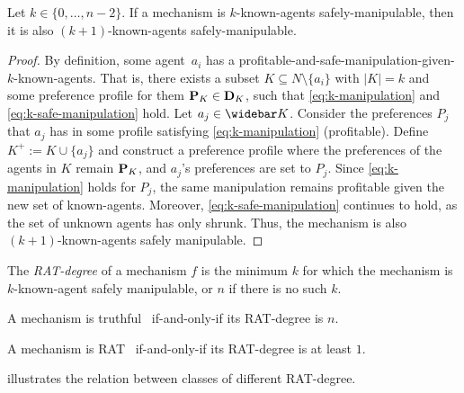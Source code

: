 \begin{propositionrep}
    Let $k \in \{0, \ldots, n-2\}$.
    If a mechanism is $k$-known-agents safely-manipulable, then it is also $(k+1)$-known-agents safely-manipulable.
\end{propositionrep}
\begin{proof}
    By definition, some agent~$a_i$ has a profitable-and-safe-manipulation-given-$k$-known-agents. 
    That is, there exists a subset $K \subseteq N \setminus \{a_i\}$ with $|K| = k$ and some preference profile for them $\mathbf{P}_{K} \in \mathbf{D}_{K}$, such that \eqref{eq:k-manipulation} and \eqref{eq:k-safe-manipulation} hold.
    Let $a_j \in \notK$.
    Consider the preferences $P_j$ that $a_j$ has in some profile satisfying \eqref{eq:k-manipulation} (profitable). 
    Define  $K^+ := K \cup \{a_j\}$ and construct a preference profile where the preferences of the agents in $K$ remain $\mathbf{P}_{K}$, and $a_j$'s preferences are set to $P_j$.
    Since \eqref{eq:k-manipulation} holds for $P_j$, the same manipulation remains profitable given the new set of known-agents.
    Moreover, \eqref{eq:k-safe-manipulation} continues to hold, as the set of unknown agents has only shrunk.
    Thus, the mechanism is also $(k+1)$-known-agents safely manipulable.
\end{proof}


\begin{definition}%
    The \emph{RAT-degree} of a mechanism $f$ is the minimum $k$ for which the mechanism is $k$-known-agent safely manipulable, or $n$ if there is no such $k$.
\end{definition}



\begin{observation}
A mechanism is truthful~ if-and-only-if its RAT-degree is $n$.
\end{observation}

\begin{observation}
 A mechanism is RAT~ if-and-only-if its RAT-degree is at least $1$.
\end{observation}

 illustrates the relation between classes of different RAT-degree. 

